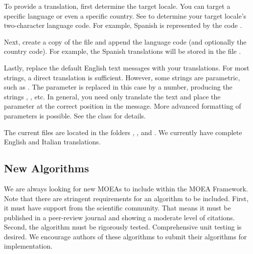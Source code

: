 To provide a translation, first determine the target locale.  You can target a specific language or even a specific country.  See  to determine your target locale's two-character language code.  For example, Spanish is represented by the code .

Next, create a copy of the  file and append the language code (and optionally the country code).  For example, the Spanish translations will be stored in the file .

Lastly, replace the default English text messages with your translations.  For most strings, a direct translation is sufficient.  However, some strings are parametric, such as .  The parameter  is replaced in this case by a number, producing the strings , , etc.  In general, you need only translate the text and place the parameter at the correct position in the message.  More advanced formatting of parameters is possible.  See the  class for details.

The current  files are located in the folders , , and .  We currently have complete English and Italian translations.

\subsection{New Algorithms}
We are always looking for new MOEAs to include within the MOEA Framework.  Note that there are stringent requirements for an algorithm to be included.  First, it must have support from the scientific community.  That means it must be published in a peer-review journal and showing a moderate level of citations.  Second, the algorithm must be rigorously tested.  Comprehensive unit testing is desired.  We encourage authors of these algorithms to submit their algorithms for implementation.